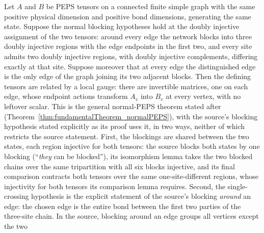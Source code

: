 \begin{theorem}%
    \label{thm:fundamentalTheorem_normalPEPS_connected}
    \leanok
    Let $A$ and $B$ be PEPS tensors on a connected finite simple graph with
    the same positive physical dimension and positive bond dimensions,
    generating the same state.  Suppose the normal blocking
    hypotheses hold at the doubly injective assignment of the two tensors:
    around every edge the network blocks into three doubly injective regions
    with the edge endpoints in the first two, and every site admits two doubly
    injective regions, with doubly injective complements, differing exactly at
    that site.  Suppose moreover that at every edge the distinguished edge is
    the only edge of the graph joining its two adjacent blocks.  Then the
    defining tensors are related by a local gauge: there are invertible
    matrices, one on each edge, whose endpoint actions transform $A_v$ into
    $B_v$ at every vertex, with no leftover scalar.
    This is the general normal-PEPS theorem stated after
    \cite[Theorem~3]{Molnar2018NormalPEPS}
    (Theorem~\ref{thm:fundamentalTheorem_normalPEPS}), with the source's
    blocking hypothesis stated explicitly as its proof uses it, in two ways,
    neither of which restricts the source statement.  First, the blockings
    are shared between the two states, each region injective for both
    tensors: the source blocks both states by one blocking (``\emph{they}
    can be blocked''), its isomorphism lemma takes the two blocked chains
    over the same tripartition with all six blocks injective, and its final
    comparison contracts both tensors over the same one-site-different
    regions, whose injectivity for both tensors its comparison lemma
    requires.  Second, the single-crossing hypothesis is the explicit
    statement of the source's blocking \emph{around} an edge: the chosen edge
    is the entire bond between the first two parties of the three-site chain.
    In the source, blocking around an edge groups all vertices except the two

\end{theorem}
